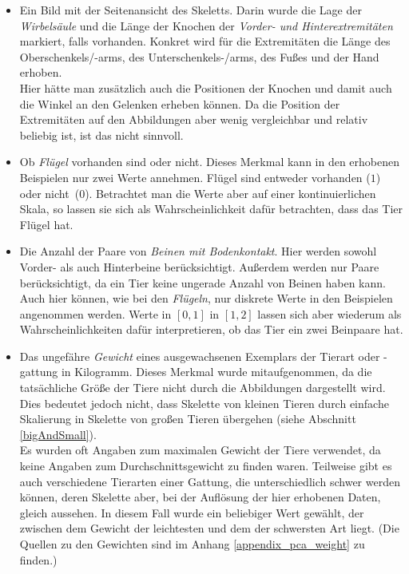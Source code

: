  \begin{itemize}
  \item Ein Bild mit der Seitenansicht des Skeletts.
  Darin wurde die Lage der \emph{Wirbelsäule} und die Länge der Knochen der \emph{Vorder- und Hinterextremitäten} markiert, falls vorhanden. Konkret wird für die Extremitäten die Länge des Oberschenkels/-arms, des Unterschenkels-/arms, des Fußes und der Hand erhoben.\\
  Hier hätte man zusätzlich auch die Positionen der Knochen und damit auch die Winkel an den Gelenken erheben können. Da die Position der Extremitäten auf den Abbildungen aber wenig vergleichbar und relativ beliebig ist, ist das nicht sinnvoll.
  
  \item Ob \emph{Flügel} vorhanden sind oder nicht. Dieses Merkmal kann in den erhobenen Beispielen nur zwei Werte annehmen. Flügel sind entweder vorhanden ($1$) oder nicht~($0$). Betrachtet man die Werte aber auf einer kontinuierlichen Skala, so lassen sie sich als Wahrscheinlichkeit dafür betrachten, dass das Tier Flügel hat.
  
  \item Die Anzahl der Paare von \emph{Beinen mit Bodenkontakt}. Hier werden sowohl Vorder- als auch Hinterbeine berücksichtigt. Außerdem werden nur Paare berücksichtigt, da ein Tier keine ungerade Anzahl von Beinen haben kann.\\
  Auch hier können, wie bei den \emph{Flügeln}, nur diskrete Werte in den Beispielen angenommen werden. Werte in $[0, 1]$ \bzw in $[1, 2]$ lassen sich aber wiederum als Wahrscheinlichkeiten dafür interpretieren, ob das Tier ein \bzw zwei Beinpaare hat.
  
  \item Das ungefähre \emph{Gewicht} eines ausgewachsenen Exemplars der Tierart oder -gattung in Kilogramm. Dieses Merkmal wurde mitaufgenommen, da die tatsächliche Größe der Tiere nicht durch die Abbildungen dargestellt wird. Dies bedeutet jedoch nicht, dass Skelette von kleinen Tieren durch einfache Skalierung in Skelette von großen Tieren übergehen (siehe Abschnitt \ref{bigAndSmall}).\\
  Es wurden oft Angaben zum maximalen Gewicht der Tiere verwendet, da keine Angaben zum Durchschnittsgewicht zu finden waren. Teilweise gibt es auch verschiedene Tierarten einer Gattung, die unterschiedlich schwer werden können, deren Skelette aber, bei der Auflösung der hier erhobenen Daten, gleich aussehen. In diesem Fall wurde ein beliebiger Wert gewählt, der zwischen dem Gewicht der leichtesten und dem der schwersten Art liegt. (Die Quellen zu den Gewichten sind im Anhang \ref{appendix_pca_weight} zu finden.)
  

\end{itemize}
